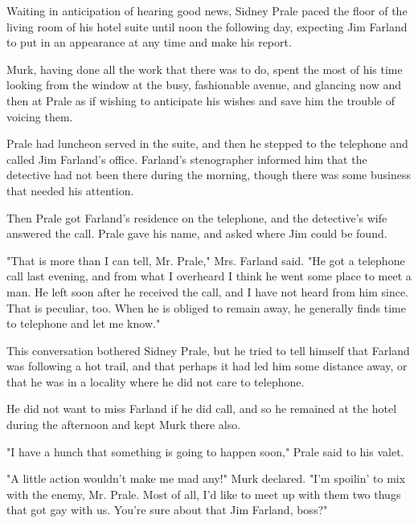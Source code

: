 \documentclass{novel}
\begin{document}
\begin{ChapterStart}
\vspace{3\nbs}
\end{ChapterStart}
    
Waiting in anticipation of hearing good news, Sidney Prale paced the floor of the living room of his hotel suite until noon the following day, expecting Jim Farland to put in an appearance at any time and make his report.

Murk, having done all the work that there was to do, spent the most of his time looking from the window at the busy, fashionable avenue, and glancing now and then at Prale as if wishing to anticipate his wishes and save him the trouble of voicing them.

Prale had luncheon served in the suite, and then he stepped to the telephone and called Jim Farland's office. Farland's stenographer informed him that the detective had not been there during the morning, though there was some business that needed his attention.

Then Prale got Farland's residence on the telephone, and the detective's wife answered the call. Prale gave his name, and asked where Jim could be found.

"That is more than I can tell, Mr. Prale," Mrs. Farland said. "He got a telephone call last evening, and from what I overheard I think he went some place to meet a man. He left soon after he received the call, and I have not heard from him since. That is peculiar, too. When he is obliged to remain away, he generally finds time to telephone and let me know."

This conversation bothered Sidney Prale, but he tried to tell himself that Farland was following a hot trail, and that perhaps it had led him some distance away, or that he was in a locality where he did not care to telephone.

He did not want to miss Farland if he did call, and so he remained at the hotel during the afternoon and kept Murk there also.

"I have a hunch that something is going to happen soon," Prale said to his valet.

"A little action wouldn't make me mad any!" Murk declared. "I'm spoilin' to mix with the enemy, Mr. Prale. Most of all, I'd like to meet up with them two thugs that got gay with us. You're sure about that Jim Farland, boss?"
\end{document}
